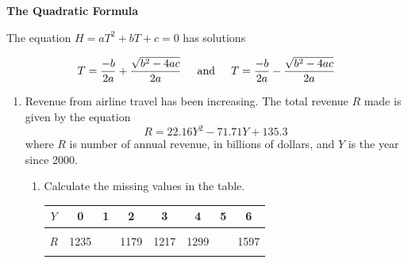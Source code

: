 \documentclass[11pt]{article}
\begin{document}
 \vspace{.2in}
 
 \begin{center}
\textbf{The Quadratic Formula}
\vspace{.1in}

The equation $H=aT^2+bT+c=0$ has solutions 


$$\displaystyle T=\frac{-b}{2a} + \frac{\sqrt{b^2-4ac}}{2a} \hspace{.2in} \text{and} \hspace{.2in}T=\frac{-b}{2a} - \frac{\sqrt{b^2-4ac}}{2a}$$

 \end{center}

\hrulefill

\newpage

\begin{enumerate}

\item Revenue from airline travel has been increasing.  The total revenue $R$ made is given by the equation $$R = 22.16Y^2-71.71Y+135.3$$
where $R$ is number of annual revenue, in billions of dollars, and $Y$ is the year since 2000.

\begin{enumerate}
\item Calculate the missing values in the table.




\begin{center}
\begin{tabular} {|c ||c |c |c |c |c |c |c |} \hline
$Y$ & \hspace{.25in}0  \hspace{.25in}   &\hspace{.25in} 1\hspace{.25in} & \hspace{.25in} 2   \hspace{.25in} &\hspace{.25in} 3  \hspace{.25in}  & \hspace{.25in}4   \hspace{.25in}  &\hspace{.25in}5  \hspace{.25in}& \hspace{.25in} 6 \hspace{.25in}  \\ \hline
&&&&&&& \\
$R$ &1235 &  & 1179 & 1217 & 1299 &   & 1597  \\ 
&&&&&&& \\ \hline
\end{tabular}
\end{center}





\end{enumerate}
\end{enumerate}
\end{document}
